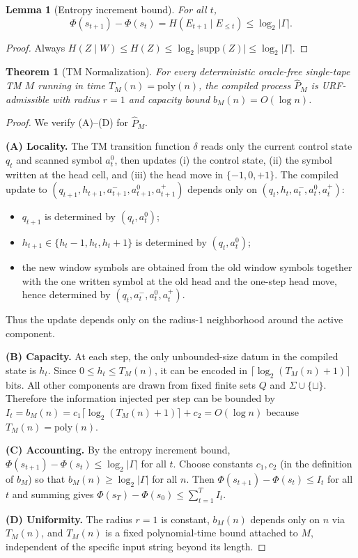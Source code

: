\documentclass[11pt]{article}
\newtheorem{theorem}{Theorem}
\newtheorem{lemma}{Lemma}
\begin{document}
\begin{lemma}[Entropy increment bound]
For all $t$,
\[
\Phi(s_{t+1})-\Phi(s_t)=H(E_{t+1}\mid E_{\le t}) \le \log_2|\Gamma|.
\]
\end{lemma}
\begin{proof}
Always $H(Z\mid W)\le H(Z)\le \log_2|\mathrm{supp}(Z)|\le \log_2|\Gamma|$.
\end{proof}

\begin{theorem}[TM Normalization]
For every deterministic oracle-free single-tape TM $M$ running in time $T_M(n)=\mathrm{poly}(n)$,
the compiled process $\widehat P_M$ is URF-admissible with radius $r=1$ and capacity bound
$b_M(n)=O(\log n)$.
\end{theorem}

\begin{proof}
We verify (A)--(D) for $\widehat P_M$.

\textbf{(A) Locality.}
The TM transition function $\delta$ reads only the current control state $q_t$ and scanned symbol $a^0_t$,
then updates (i) the control state, (ii) the symbol written at the head cell, and (iii) the head move in
$\{-1,0,+1\}$.
The compiled update to $(q_{t+1},h_{t+1},a^-_{t+1},a^0_{t+1},a^+_{t+1})$ depends only on
$(q_t,h_t,a^-_t,a^0_t,a^+_t)$:
\begin{itemize}
\item $q_{t+1}$ is determined by $(q_t,a^0_t)$;
\item $h_{t+1}\in\{h_t-1,h_t,h_t+1\}$ is determined by $(q_t,a^0_t)$;
\item the new window symbols are obtained from the old window symbols together with the one written symbol
at the old head and the one-step head move, hence determined by $(q_t,a^-_t,a^0_t,a^+_t)$.
\end{itemize}
Thus the update depends only on the radius-$1$ neighborhood around the active component.

\textbf{(B) Capacity.}
At each step, the only unbounded-size datum in the compiled state is $h_t$.
Since $0\le h_t\le T_M(n)$, it can be encoded in $\lceil\log_2(T_M(n)+1)\rceil$ bits.
All other components are drawn from fixed finite sets $Q$ and $\Sigma\cup\{\sqcup\}$.
Therefore the information injected per step can be bounded by
$I_t=b_M(n)=c_1\lceil\log_2(T_M(n)+1)\rceil+c_2=O(\log n)$
because $T_M(n)=\mathrm{poly}(n)$.

\textbf{(C) Accounting.}
By the entropy increment bound,
$\Phi(s_{t+1})-\Phi(s_t)\le \log_2|\Gamma|$ for all $t$.
Choose constants $c_1,c_2$ (in the definition of $b_M$) so that $b_M(n)\ge \log_2|\Gamma|$ for all $n$.
Then $\Phi(s_{t+1})-\Phi(s_t)\le I_t$ for all $t$ and summing gives
$\Phi(s_T)-\Phi(s_0)\le \sum_{t=1}^T I_t$.

\textbf{(D) Uniformity.}
The radius $r=1$ is constant, $b_M(n)$ depends only on $n$ via $T_M(n)$, and $T_M(n)$ is a fixed
polynomial-time bound attached to $M$, independent of the specific input string beyond its length.
\end{proof}
\end{document}
